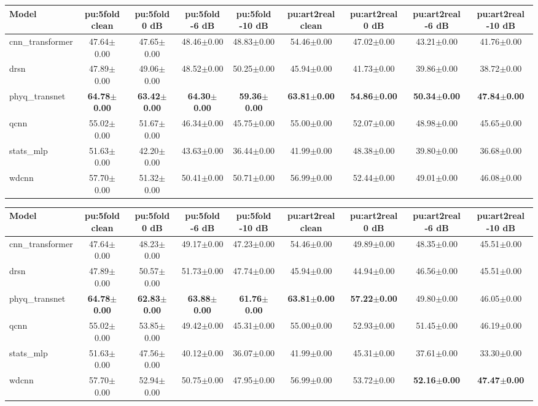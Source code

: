\begin{tabular}{lcccccccc}
\toprule
Model & pu:5fold clean & pu:5fold 0 dB & pu:5fold -6 dB & pu:5fold -10 dB & pu:art2real clean & pu:art2real 0 dB & pu:art2real -6 dB & pu:art2real -10 dB \\
\midrule
cnn\_transformer & 47.64$\pm$0.00 & 47.65$\pm$0.00 & 48.46$\pm$0.00 & 48.83$\pm$0.00 & 54.46$\pm$0.00 & 47.02$\pm$0.00 & 43.21$\pm$0.00 & 41.76$\pm$0.00 \\
drsn & 47.89$\pm$0.00 & 49.06$\pm$0.00 & 48.52$\pm$0.00 & 50.25$\pm$0.00 & 45.94$\pm$0.00 & 41.73$\pm$0.00 & 39.86$\pm$0.00 & 38.72$\pm$0.00 \\
phyq\_transnet & \textbf{64.78$\pm$0.00} & \textbf{63.42$\pm$0.00} & \textbf{64.30$\pm$0.00} & \textbf{59.36$\pm$0.00} & \textbf{63.81$\pm$0.00} & \textbf{54.86$\pm$0.00} & \textbf{50.34$\pm$0.00} & \textbf{47.84$\pm$0.00} \\
qcnn & 55.02$\pm$0.00 & 51.67$\pm$0.00 & 46.34$\pm$0.00 & 45.75$\pm$0.00 & 55.00$\pm$0.00 & 52.07$\pm$0.00 & 48.98$\pm$0.00 & 45.65$\pm$0.00 \\
stats\_mlp & 51.63$\pm$0.00 & 42.20$\pm$0.00 & 43.63$\pm$0.00 & 36.44$\pm$0.00 & 41.99$\pm$0.00 & 48.38$\pm$0.00 & 39.80$\pm$0.00 & 36.68$\pm$0.00 \\
wdcnn & 57.70$\pm$0.00 & 51.32$\pm$0.00 & 50.41$\pm$0.00 & 50.71$\pm$0.00 & 56.99$\pm$0.00 & 52.44$\pm$0.00 & 49.01$\pm$0.00 & 46.08$\pm$0.00 \\
\bottomrule
\end{tabular}

\begin{tabular}{lcccccccc}
\toprule
Model & pu:5fold clean & pu:5fold 0 dB & pu:5fold -6 dB & pu:5fold -10 dB & pu:art2real clean & pu:art2real 0 dB & pu:art2real -6 dB & pu:art2real -10 dB \\
\midrule
cnn\_transformer & 47.64$\pm$0.00 & 48.23$\pm$0.00 & 49.17$\pm$0.00 & 47.23$\pm$0.00 & 54.46$\pm$0.00 & 49.89$\pm$0.00 & 48.35$\pm$0.00 & 45.51$\pm$0.00 \\
drsn & 47.89$\pm$0.00 & 50.57$\pm$0.00 & 51.73$\pm$0.00 & 47.74$\pm$0.00 & 45.94$\pm$0.00 & 44.94$\pm$0.00 & 46.56$\pm$0.00 & 45.51$\pm$0.00 \\
phyq\_transnet & \textbf{64.78$\pm$0.00} & \textbf{62.83$\pm$0.00} & \textbf{63.88$\pm$0.00} & \textbf{61.76$\pm$0.00} & \textbf{63.81$\pm$0.00} & \textbf{57.22$\pm$0.00} & 49.80$\pm$0.00 & 46.05$\pm$0.00 \\
qcnn & 55.02$\pm$0.00 & 53.85$\pm$0.00 & 49.42$\pm$0.00 & 45.31$\pm$0.00 & 55.00$\pm$0.00 & 52.93$\pm$0.00 & 51.45$\pm$0.00 & 46.19$\pm$0.00 \\
stats\_mlp & 51.63$\pm$0.00 & 47.56$\pm$0.00 & 40.12$\pm$0.00 & 36.07$\pm$0.00 & 41.99$\pm$0.00 & 45.31$\pm$0.00 & 37.61$\pm$0.00 & 33.30$\pm$0.00 \\
wdcnn & 57.70$\pm$0.00 & 52.94$\pm$0.00 & 50.75$\pm$0.00 & 47.95$\pm$0.00 & 56.99$\pm$0.00 & 53.72$\pm$0.00 & \textbf{52.16$\pm$0.00} & \textbf{47.47$\pm$0.00} \\
\bottomrule
\end{tabular}
